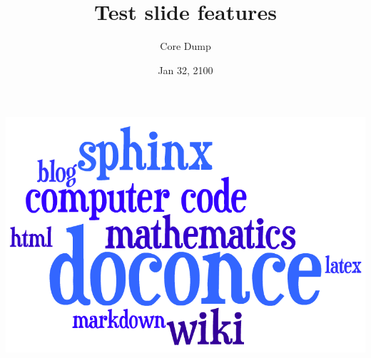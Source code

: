\documentclass[%
oneside,                 %
final,                   %
10pt]{article}
\newcounter{doconce:movie:counter}
\begin{document}
\newcommand{\exercisesection}[1]{\subsection*{#1}}


\title{Test slide features}
\author{Core Dump}
\date{Jan 32, 2100
}
\vspace{6mm}
\centerline{\includegraphics[width=0.5\linewidth]{testfigs/doconce1b.png}}
\vspace{6mm}
\end{document}
